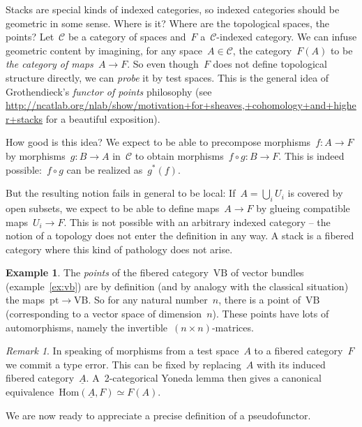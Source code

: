 \documentclass[a4paper,english,12pt]{scrartcl}
\theoremstyle{definition}
\newtheorem{ex}[defn]{Example}
\theoremstyle{plain}
\theoremstyle{remark}
\newtheorem{rem}[defn]{Remark}
\newcommand{\C}{\mathcal{C}}
\newcommand{\VB}{\mathrm{VB}}
\newcommand{\pt}{\mathrm{pt}}
\newcommand{\Hom}{\mathrm{Hom}}
\newcommand{\ul}[1]{\underline{#1}}
\begin{document}
Stacks are special kinds of indexed categories, so indexed categories should
be geometric in some sense. Where is it? Where are the topological spaces, the
points? Let~$\C$ be a category of spaces and~$F$ a~$\C$-indexed category. We
can infuse geometric content by imagining, for any space~$A \in \C$, the
category~$F(A)$ to be \emph{the category of maps~$A \to F$}. So even though~$F$
does not define topological structure directly, we can \emph{probe} it by test
spaces. This is the general idea of Grothendieck's \emph{functor of points}
philosophy (see
\url{http://ncatlab.org/nlab/show/motivation+for+sheaves,+cohomology+and+higher+stacks}
for a beautiful exposition).

How good is this idea? We expect to be able to precompose morphisms~$f : A \to F$
by morphisms~$g : B \to A$ in~$\C$ to obtain morphisms~$f \circ g : B \to F$.
This is indeed possible:~$f \circ g$ can be realized as~$g^*(f)$.

But the resulting notion fails in general to be local: If~$A = \bigcup_i U_i$
is covered by open subsets, we expect to be able to define maps~$A \to F$ by
glueing compatible maps~$U_i \to F$. This is not possible with an arbitrary
indexed category -- the notion of a topology does not enter the definition in
any way. A stack is a fibered category where this kind of pathology does not
arise.

\begin{ex}The \emph{points} of the fibered category~$\VB$ of vector bundles
(example~\ref{ex:vb}) are by definition (and by analogy with the classical
situation) the maps~$\pt \to \VB$. So for any natural number~$n$, there is a point
of~$\VB$ (corresponding to a vector space of dimension~$n$). These points
have lots of automorphisms, namely the invertible~$(n \times n)$-matrices.
\end{ex}

\begin{rem}In speaking of morphisms from a test space~$A$ to a fibered
category~$F$ we commit a type error. This can be fixed by replacing~$A$ with
its induced fibered category~$\ul{A}$. A~2-categorical Yoneda lemma then gives
a canonical equivalence~$\Hom(\ul{A},F) \simeq F(A)$.
\end{rem}

We are now ready to appreciate a precise definition of a pseudofunctor.
\end{document}
